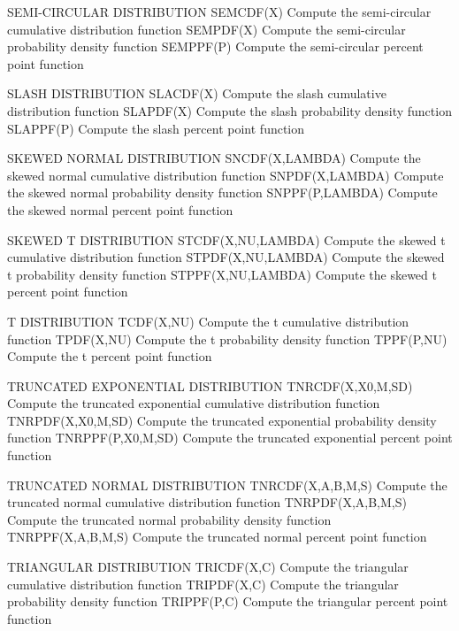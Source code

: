 SEMI-CIRCULAR DISTRIBUTION
   SEMCDF(X)          Compute the semi-circular cumulative distribution
                      function
   SEMPDF(X)          Compute the semi-circular probability density
                      function
   SEMPPF(P)          Compute the semi-circular percent point function

SLASH DISTRIBUTION
   SLACDF(X)          Compute the slash cumulative distribution
                      function
   SLAPDF(X)          Compute the slash probability density function
   SLAPPF(P)          Compute the slash percent point function
 
SKEWED NORMAL DISTRIBUTION
   SNCDF(X,LAMBDA)    Compute the skewed normal cumulative
                      distribution function
   SNPDF(X,LAMBDA)    Compute the skewed normal probability density
                      function
   SNPPF(P,LAMBDA)    Compute the skewed normal percent point function

SKEWED T DISTRIBUTION
   STCDF(X,NU,LAMBDA) Compute the skewed t cumulative distribution
                      function
   STPDF(X,NU,LAMBDA) Compute the skewed t probability density
                      function
   STPPF(X,NU,LAMBDA) Compute the skewed t percent point function
 
T DISTRIBUTION
   TCDF(X,NU)         Compute the t cumulative distribution function
   TPDF(X,NU)         Compute the t probability density function
   TPPF(P,NU)         Compute the t percent point function
 
TRUNCATED EXPONENTIAL DISTRIBUTION
   TNRCDF(X,X0,M,SD)  Compute the truncated exponential cumulative
                      distribution function
   TNRPDF(X,X0,M,SD)  Compute the truncated exponential probability
                      density function
   TNRPPF(P,X0,M,SD)  Compute the truncated exponential percent point
                      function
 
TRUNCATED NORMAL DISTRIBUTION
   TNRCDF(X,A,B,M,S)  Compute the truncated normal cumulative
                      distribution function
   TNRPDF(X,A,B,M,S)  Compute the truncated normal probability density
                      function
   TNRPPF(X,A,B,M,S)  Compute the truncated normal percent point
                      function
 
TRIANGULAR DISTRIBUTION
   TRICDF(X,C)        Compute the triangular cumulative distribution
                      function
   TRIPDF(X,C)        Compute the triangular probability density
                      function
   TRIPPF(P,C)        Compute the triangular percent point function
 
